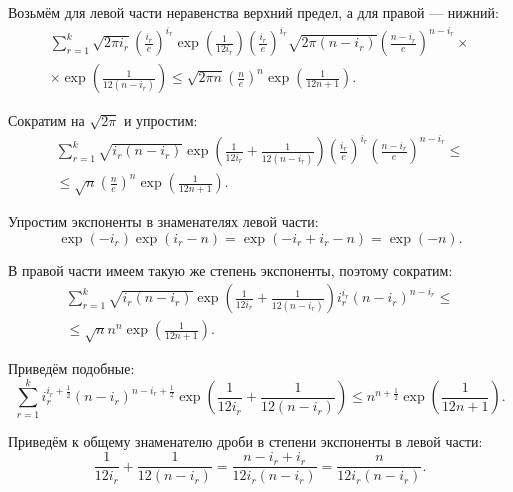Возьмём для левой части неравенства верхний предел, а для правой --- нижний:
\begin{equation*}
\begin{split}
\sum \limits_{r=1}^k \sqrt{2 \pi i_r} \left( \frac{i_r}{e} \right)^{i_r} \exp \left( \frac{1}{12 i_r} \right)
\left( \frac{i_r}{e} \right)^{i_r} \sqrt{2 \pi  \left( n-i_r\right) }
\left( \frac{n-i_r}{e} \right)^{n-i_r} \times \\
\times \exp \left( \frac{1}{12 \left( n-i_r\right) } \right) \leq 
\sqrt{2 \pi n} \left( \frac{n}{e} \right)^n \exp \left( \frac{1}{12 n+1} \right).
\end{split}
\end{equation*}

Сократим на $ \sqrt{2 \pi } $ и упростим:
\begin{equation*}
\begin{split}
\sum \limits_{r=1}^k \sqrt{i_r \left( n-i_r \right) }
\exp \left( \frac{1}{12 i_r} + \frac{1}{12 \left( n-i_r \right) } \right) \left( \frac{i_r}{e} \right)^{i_r}
\left( \frac{n-i_r}{e} \right)^{n-i_r} \leq \\
\leq \sqrt{n} \left( \frac{n}{e} \right)^n \exp \left( \frac{1}{12 n+1} \right).
\end{split}
\end{equation*}

Упростим экспоненты в знаменателях левой части:
$$ \exp \left( - i_r \right) \exp \left( i_r - n \right) =
\exp \left( - i_r + i_r - n \right) =
\exp \left( -n \right).$$

В правой части имеем такую же степень экспоненты, поэтому сократим:
\begin{equation*}
\begin{split}
\sum \limits_{r=1}^k \sqrt{i_r \left( n-i_r \right) }
\exp \left( \frac{1}{12 i_r} + \frac{1}{12 \left( n-i_r \right) } \right) i_r^{i_r} \left( n-i_r \right)^{n-i_r} \leq \\
\leq \sqrt{n} n^n \exp \left( \frac{1}{12 n+1} \right).
\end{split}
\end{equation*}

Приведём подобные:
$$ \sum \limits_{r=1}^k i_r^{i_r + \frac{1}{2} } \left( n-i_r \right)^{n - i_r + \frac{1}{2} }
\exp \left( \frac{1}{12 i_r} + \frac{1}{12 \left( n-i_r \right) } \right) \leq
n^{n + \frac{1}{2} } \exp \left( \frac{1}{12 n+1} \right). $$

Приведём к общему знаменателю дроби в степени экспоненты в левой части:
$$ \frac{1}{12 i_r} + \frac{1}{12 \left( n-i_r \right) } =
\frac{n - i_r + i_r}{12 i_r \left( n-i_r \right) } =
\frac{n}{12 i_r \left( n-i_r \right) }. $$

